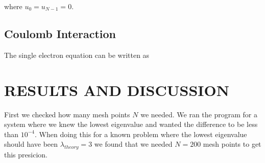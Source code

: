 \documentclass[%
 reprint,
 nobalancelastpage,
 amsmath,amssymb,
 aps,
]{revtex4-1}
\begin{document}
where $u_{0} = u_{N-1} = 0$.

\subsection{Coulomb Interaction}
The single electron equation can be written as 


\section{RESULTS AND DISCUSSION}
First we checked how many mesh points $N$ we needed. We ran the program for a system where we knew the lowest eigenvalue and wanted the difference to be less than $10^{-4}$. When doing this for a known problem where the lowest eigenvalue should have been $\lambda_{theory} = 3$ we found that we needed $N=200$ mesh points to get this presicion.\\
  







\end{document}
